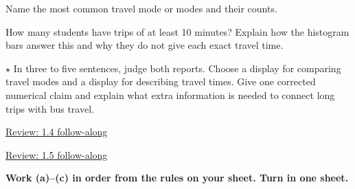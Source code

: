 \documentclass[12pt]{extarticle}
\begin{document}
\begin{description}[leftmargin=1.15in, labelwidth=1in, itemsep=2pt, topsep=2pt]
  \item[\dokbadge{1}~(a)] Name the most common travel mode or modes and their counts.
  \item[\dokbadge{2}~(b)] How many students have trips of at least 10 minutes? Explain how the histogram bars answer this and why they do not give each exact travel time.
  \item[\dokbadge{3}~(c)] $\star$ In three to five sentences, judge both reports. Choose a display for comparing travel modes and a display for describing travel times. Give one corrected numerical claim and explain what extra information is needed to connect long trips with bus travel.
\end{description}

\vfill
\begin{minipage}{0.48\linewidth}\quad \href{https://robjohncolson.github.io/apstats-live-worksheet/u1_lesson4_live.html}{Review: 1.4 follow-along}\end{minipage}\hfill
\begin{minipage}{0.48\linewidth}\quad \href{https://robjohncolson.github.io/apstats-live-worksheet/u1_lesson5_live.html}{Review: 1.5 follow-along}\end{minipage}\hfill
\textbf{Work (a)--(c) in order from the rules on your sheet. Turn in one sheet.}
\end{document}

